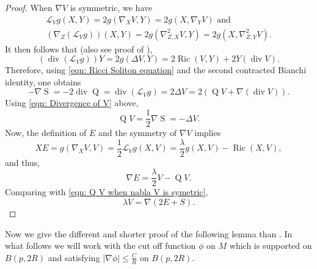 \documentclass{amsart}
\newcommand{\abs}[1]{\left| #1 \right|}
\newcommand{\lie}[1]{\mathcal{L}_{#1}}
\newcommand{\brackets}[1]{\left( #1 \right)}
\DeclareMathOperator*{\ricci}{Ric}
\DeclareMathOperator*{\Qricci}{Q}
\DeclareMathOperator*{\scalar}{S}
\DeclareMathOperator*{\divergence}{div}
\theoremstyle{plain}
\theoremstyle{plain}
\theoremstyle{plain}
\theoremstyle{plain}
\theoremstyle{remark}
\begin{document}
\begin{proof}
    When $\nabla V$ is symmetric, we have
    \begin{gather*}
        \lie{V}g (X,Y) = 2g(\nabla_X V, Y) = 2g(X, \nabla_Y V) \text{ and } \\
        (\nabla_Z (\lie{V}g))(X,Y) = 2g(\nabla^2_{Z,X} V, Y) = 2g(X, \nabla^2_{Z,Y} V) .
    \end{gather*}
    It then follows that (also see proof of ),
    $$ (\divergence (\lie{V} g) ) Y = 2g (\Delta V, Y) = 2\ricci(V,Y) + 2 Y(\divergence V) . $$
    Therefore, using \cref{eqn: Ricci Soliton equation} and the second contracted Bianchi identity, one obtains
    \begin{equation*}
        -\nabla\scalar = -2 \divergence\Qricci = \divergence (\lie{V} g) = 2 \Delta V = 2 ( \Qricci V + \nabla(\divergence V) ) .
    \end{equation*}
    Using \cref{eqn: Divergence of V} above,
    \begin{equation}\label{eqn: Q V when nabla V is symetric}
        \Qricci V = \frac{1}{2} \nabla\scalar = - \Delta V.
    \end{equation}
    Now, the definition of $E$ and the symmetry of $\nabla V$ implies
    $$ X E = g(\nabla_X V, V) =  \frac{1}{2} \lie{V} g (X,V) = \frac{\lambda }{2} g(X,V) - \ricci (X,V), $$
    and thus,
    $$ \nabla E = \frac{\lambda}{2} V - \Qricci V .$$
    Comparing with \cref{eqn: Q V when nabla V is symetric},
    $$ \lambda V = \nabla \brackets{ 2 E + S }  . $$
\end{proof}








Now we  give the different and shorter proof of the following lemma  than \cite[p. 660]{MR4518934}.
In what follows we will work with
the cut off function $\phi$ on $M$ which is supported 
on $B(p, 2R)$ and satisfying $\abs{\nabla \phi} \leq \frac{C}{R}$ on $B(p, 2R)$.
\end{document}
